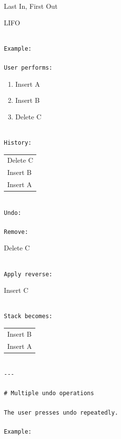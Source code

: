 \documentclass[
  oneside,
  openany]{book}
\begin{document}
Last In, First Out

LIFO

\begin{verbatim}

Example:

User performs:
\end{verbatim}

\begin{enumerate}
\def\labelenumi{\arabic{enumi}.}
\item
  Insert A
\item
  Insert B
\item
  Delete C
\end{enumerate}

\begin{verbatim}

History:
\end{verbatim}

\begin{longtable}[]{@{}
  >{\raggedright\arraybackslash}p{}@{}}
\toprule\noalign{}
\endhead
\bottomrule\noalign{}
\endlastfoot
Delete C \\
Insert B \\
Insert A \\
\end{longtable}

\begin{verbatim}

Undo:

Remove:
\end{verbatim}

Delete C

\begin{verbatim}

Apply reverse:
\end{verbatim}

Insert C

\begin{verbatim}

Stack becomes:
\end{verbatim}

\begin{longtable}[]{@{}
  >{\raggedright\arraybackslash}p{}@{}}
\toprule\noalign{}
\endhead
\bottomrule\noalign{}
\endlastfoot
Insert B \\
Insert A \\
\end{longtable}

\begin{verbatim}

---

# Multiple undo operations

The user presses undo repeatedly.

Example:
\end{verbatim}
\end{document}
